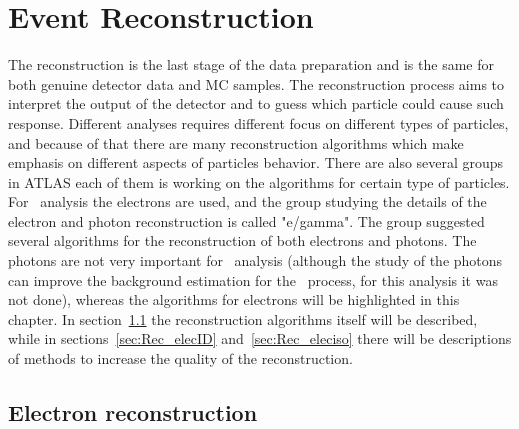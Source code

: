 \chapter{Event Reconstruction}
\label{sec:Reconstruction}

The reconstruction is the last stage of the data preparation and is the same for both genuine detector data and MC samples. The reconstruction process aims to interpret the output of the detector and to guess which particle could cause such response. Different analyses requires different focus on different types of particles, and because of that there are many reconstruction algorithms which make emphasis on different aspects of particles behavior. There are also several groups in ATLAS each of them is working on the algorithms for certain type of particles. For \Zee\ analysis the electrons are used, and the group studying the details of the electron and photon reconstruction is called "e/gamma". The group suggested several algorithms for the reconstruction of both electrons and photons. The photons are not very important for \Zee\ analysis (although the study of the photons can improve the background estimation for the \Zee\ process, for this analysis it was not done), whereas the algorithms for electrons will be highlighted in this chapter. In section~\ref{sec:Rec_elec} the reconstruction algorithms itself will be described, while in sections~\ref{sec:Rec_elecID} and~\ref{sec:Rec_eleciso} there will be descriptions of methods to increase the quality of the reconstruction.

\section{Electron reconstruction}
\label{sec:Rec_elec}

